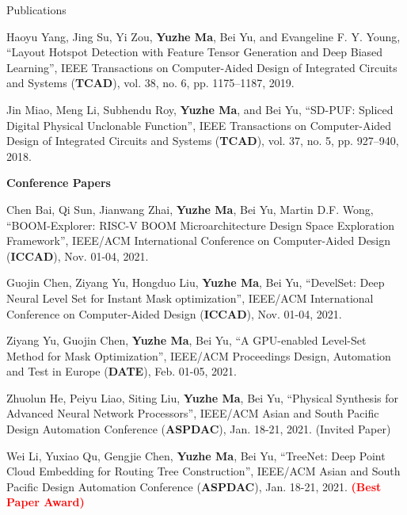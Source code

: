 \begin{rSection}{Publications}
\begin{description}[font=\normalfont]
\item[{[J2]}]{
	Haoyu Yang, Jing Su, Yi Zou, \textbf{Yuzhe Ma}, Bei Yu, and Evangeline F. Y. Young,
	``Layout Hotspot Detection with Feature Tensor Generation and Deep Biased Learning'',
	IEEE Transactions on Computer-Aided Design of Integrated Circuits and Systems (\textbf{TCAD}), vol. 38, no. 6, pp. 1175--1187, 2019.
}

\item[{[J1]}]{
	Jin Miao, Meng Li, Subhendu Roy, \textbf{Yuzhe Ma}, and Bei Yu,
	``SD-PUF: Spliced Digital Physical Unclonable Function'',
	IEEE Transactions on Computer-Aided Design of Integrated Circuits and Systems (\textbf{TCAD}), vol. 37, no. 5, pp. 927--940, 2018.
}
\end{description}


\textbf{Conference Papers}
\begin{description}[font=\normalfont]
\item [{[C24]}]{
    Chen Bai, Qi Sun, Jianwang Zhai, \textbf{Yuzhe Ma}, Bei Yu, Martin D.F. Wong,
    ``BOOM-Explorer: RISC-V BOOM Microarchitecture Design Space Exploration Framework'',
    IEEE/ACM International Conference on Computer-Aided Design (\textbf{ICCAD}), Nov. 01-04, 2021.
}


\item [{[C23]}]{
    Guojin Chen, Ziyang Yu, Hongduo Liu, \textbf{Yuzhe Ma}, Bei Yu,
    ``DevelSet: Deep Neural Level Set for Instant Mask optimization'',
    IEEE/ACM International Conference on Computer-Aided Design (\textbf{ICCAD}), Nov. 01-04, 2021.
}

\item [{[C22]}]{
        Ziyang Yu, Guojin Chen, \textbf{Yuzhe Ma}, Bei Yu,
        ``A GPU-enabled Level-Set Method for Mask Optimization'',
        IEEE/ACM Proceedings Design, Automation and Test in Europe (\textbf{DATE}), Feb. 01-05, 2021.
    }

\item [{[C21]}]{
        Zhuolun He, Peiyu Liao, Siting Liu, \textbf{Yuzhe Ma}, Bei Yu,
        ``Physical Synthesis for Advanced Neural Network Processors'',
         IEEE/ACM Asian and South Pacific Design Automation Conference (\textbf{ASPDAC}), Jan. 18-21, 2021. (Invited Paper)
    }

\item [{[C20]}]{
        Wei Li, Yuxiao Qu, Gengjie Chen, \textbf{Yuzhe Ma}, Bei Yu,
        ``TreeNet: Deep Point Cloud Embedding for Routing Tree Construction'',
         IEEE/ACM Asian and South Pacific Design Automation Conference (\textbf{ASPDAC}), Jan. 18-21, 2021.
        \textcolor{red}{\textbf{(Best Paper Award)}}
    }


\end{description}
\end{rSection}
